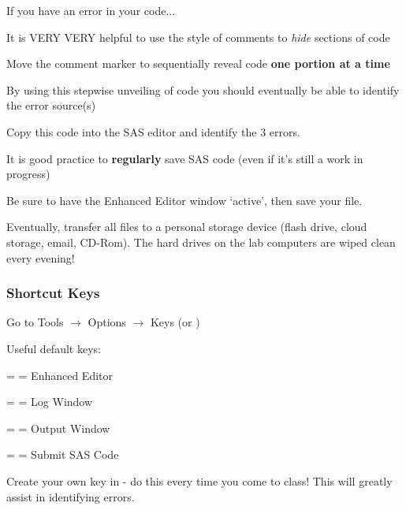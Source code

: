 \begin{frame}
If you have an error in your code...
\bi
\item It is VERY VERY helpful to use the  style of comments to \emph{hide} sections of code
\item Move the comment marker to sequentially reveal code \textbf{one portion at a time}
\item By using this stepwise unveiling of code you should eventually be able to identify the error source(s)
\ei
\end{frame}

\begin{frame}[fragile]
\fto
Copy this code into the SAS editor and identify the 3 errors.
\footnotesize
{}
\emp
\end{frame}

\begin{frame}
\bi
\item It is good practice to \textbf{regularly} save SAS code (even if it's still a work in progress)
\item Be sure to have the Enhanced Editor window `active', then save your file.
\item Eventually, transfer all files to a personal storage device (flash drive, cloud storage, email, CD-Rom). The hard drives on the lab computers are wiped clean every evening!
\ei
\end{frame}



\begin{frame}
\frametitle{Shortcut Keys}
\bi
\item Go to Tools $\rightarrow$ Options $\rightarrow$ Keys (or )
\item[] Useful default keys:
\bi
\item {} =  = Enhanced Editor
\item {} =  = Log Window
\item {} =  = Output Window
\item {} =  = Submit SAS Code
\ei
\item Create your own key in  - do this every time you come to class!  This will greatly assist in identifying errors.
\item[] 
\ei
\end{frame}

 